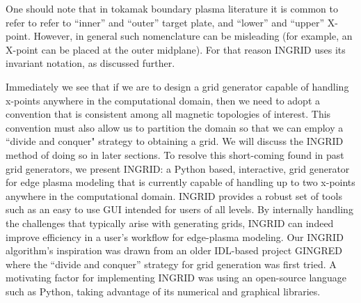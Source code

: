 One should note that in tokamak boundary plasma literature it is
common to refer to refer to ``inner'' and ``outer'' target plate, and
``lower'' and ``upper'' X-point. However, in general such nomenclature
can be misleading (for example, an X-point can be placed at the outer
midplane). For that reason INGRID uses its invariant notation, as
discussed further.

%


\indent Immediately we see that if we are to design a grid generator
capable of handling x-points anywhere in the computational domain,
then we need to adopt a convention that is consistent among all
magnetic topologies of interest. This convention must also allow us to
partition the domain so that we can employ a ``divide and conquer"
strategy to obtaining a grid. We will discuss the INGRID method of
doing so in later sections.  To resolve this short-coming found in
past grid generators, we present INGRID: a Python based, interactive,
grid generator for edge plasma modeling that is currently capable of
handling up to two x-points anywhere in the computational
domain. INGRID provides a robust set of tools such as an easy to use
GUI intended for users of all levels. By internally handling the
challenges that typically arise with generating grids, INGRID can
indeed improve efficiency in a user's workflow for edge-plasma
modeling. Our INGRID algorithm's inspiration was drawn from an older
IDL-based project GINGRED \cite{izacard_umansky} where the ``divide
and conquer'' strategy for grid generation was first tried. A
motivating factor for implementing INGRID was using an open-source
language such as Python, taking advantage of its numerical and
graphical libraries.


